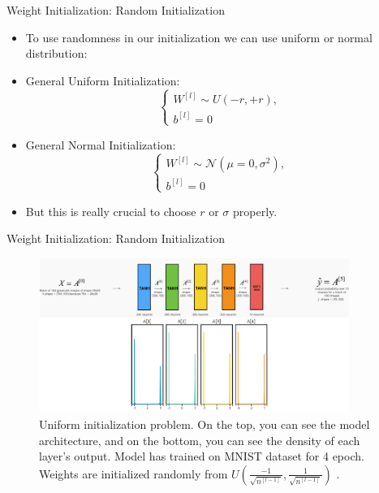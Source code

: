 \documentclass[compress,oilve,t]{beamer}
\begin{document}
\begin{frame}{Weight Initialization: Random Initialization}
	\begin{itemize}
		\item To use randomness in our initialization we can use uniform or normal distribution:
		\medskip
		\item[]\begin{block}{General Uniform Initialization:}
			\[
			\begin{cases}
				W^{[l]} \sim U(-r, +r),\\
				b^{[l]} = 0
			\end{cases}
			\]
		\end{block}
		\item[]\begin{block}{General Normal Initialization:}
			\[
			\begin{cases}
				W^{[l]} \sim \mathcal{N}(\mu=0, \sigma^2),\\
				b^{[l]} = 0
			\end{cases}
			\]
		\end{block}
		\item But this is really crucial to choose $r$ or $\sigma$ properly.
	\end{itemize}
\end{frame}

\begin{frame}{Weight Initialization: Random Initialization}
	\begin{figure}[H]
		\centering
		\includegraphics[width=0.9\textwidth]{Figs/normal-init.png}
		\caption{Uniform initialization problem. On the top, you can see the model architecture, and on the bottom, you can see the density of each layer's output. Model has trained on MNIST dataset for 4 epoch. Weights are initialized randomly from $U(\frac{-1}{\sqrt{n^{[l-1]}}}, \frac{1}{\sqrt{n^{[l-1]}}})$ \cite{katanforoosh-kunin}.}
	\end{figure}
\end{frame}
\end{document}
